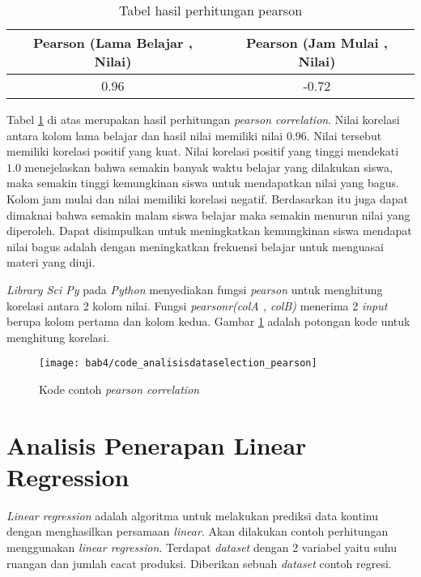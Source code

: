 \begin{table}[H]
 \caption{Tabel hasil perhitungan pearson}
\centering
\begin{tabular}{|c|c|}
 \hline 
 Pearson (Lama Belajar , Nilai) & Pearson (Jam Mulai , Nilai) \\ 
 \hline 
 0.96 & -0.72 \\ 
 \hline 
 \end{tabular}  
 \label{tab:TabelHasilPearson}
\end{table}

Tabel \ref{tab:TabelHasilPearson} di atas merupakan hasil perhitungan \textit{pearson correlation}. Nilai korelasi antara kolom lama belajar dan hasil nilai memiliki nilai $0.96$. Nilai tersebut memiliki korelasi positif yang kuat. Nilai korelasi positif yang tinggi mendekati $1.0$ menejelaskan bahwa semakin banyak waktu belajar yang dilakukan siswa, maka semakin tinggi kemungkinan siswa untuk mendapatkan nilai yang bagus. Kolom jam mulai dan nilai memiliki korelasi negatif. Berdasarkan itu juga dapat dimaknai bahwa semakin malam siswa belajar maka semakin menurun nilai yang diperoleh. Dapat disimpulkan untuk meningkatkan kemungkinan siswa mendapat nilai bagus adalah dengan meningkatkan frekuensi belajar untuk menguasai materi yang diuji.


\textit{Library Sci Py} pada \textit{Python} menyediakan fungsi \textit{pearson} untuk menghitung korelasi antara 2 kolom nilai. Fungsi \textit{pearsonr(colA , colB)} menerima 2 \textit{input} berupa kolom pertama dan kolom kedua. Gambar \ref{fig:code_analisisdataselection_pearson} adalah potongan kode untuk menghitung korelasi.



\begin{figure}[H]
	\centering  
	\texttt{[image: bab4/code\_analisisdataselection\_pearson]}   
	\caption{Kode contoh \textit{pearson correlation}}
	\label{fig:code_analisisdataselection_pearson} 
\end{figure} 



\section{Analisis Penerapan Linear Regression}
\textit{Linear regression} adalah algoritma untuk melakukan prediksi data kontinu dengan menghasilkan persamaan \textit{linear}. Akan dilakukan contoh perhitungan menggunakan \textit{linear regression}. Terdapat \textit{dataset} dengan 2 variabel yaitu suhu ruangan dan jumlah cacat produksi. Diberikan sebuah \textit{dataset} contoh regresi.

